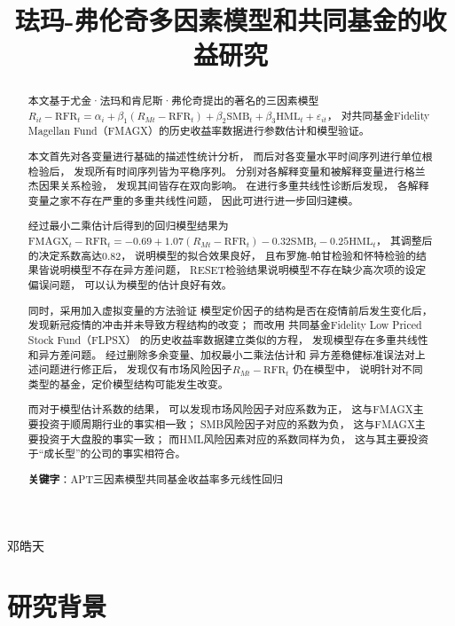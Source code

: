 \documentclass[UTF8]{ctexart}
\title{\textbf{珐玛-弗伦奇多因素模型和共同基金的收益研究} \vspace{-2.5em}}
\date{}
\begin{document}
\maketitle
\centerline{邓皓天}
\renewcommand{\abstractname}{\Large 摘要\\}
\begin{abstract}
  本文基于尤金·法玛和肯尼斯·弗伦奇提出的著名的三因素模型
  $R_{it}-\mathrm{RFR}_t=\alpha _i+\beta _1\left( R_{Mt}-\mathrm{RFR}_t \right) +\beta _2\mathrm{SMB}_t+\beta _3\mathrm{HML}_t+\varepsilon _{it}$，
  对共同基金Fidelity Magellan Fund（FMAGX）的历史收益率数据进行参数估计和模型验证。

  本文首先对各变量进行基础的描述性统计分析，
  而后对各变量水平时间序列进行单位根检验后，
  发现所有时间序列皆为平稳序列。
  分别对各解释变量和被解释变量进行格兰杰因果关系检验，
  发现其间皆存在双向影响。
  在进行多重共线性诊断后发现，
  各解释变量之家不存在严重的多重共线性问题，
  因此可进行进一步回归建模。

  经过最小二乘估计后得到的回归模型结果为
  $\text{FMAGX}_t-\mathrm{RFR}_t=-0.69+1.07\left( R_{Mt}-\mathrm{RFR}_t \right) -0.32\mathrm{SMB}_t-0.25\mathrm{HML}_t$，
  其调整后的决定系数高达0.82，
  说明模型的拟合效果良好，
  且布罗施-帕甘检验和怀特检验的结果皆说明模型不存在异方差问题，
  RESET检验结果说明模型不存在缺少高次项的设定偏误问题，
  可以认为模型的估计良好有效。

  同时，采用加入虚拟变量的方法验证
  模型定价因子的结构是否在疫情前后发生变化后，
  发现新冠疫情的冲击并未导致方程结构的改变；
  而改用
  共同基金Fidelity Low Priced Stock Fund（FLPSX）
  的历史收益率数据建立类似的方程，
  发现模型存在多重共线性和异方差问题。
  经过删除多余变量、加权最小二乘法估计和
  异方差稳健标准误法对上述问题进行修正后，
  发现仅有市场风险因子$R_{Mt}-\mathrm{RFR}_t$
  仍在模型中，
  说明针对不同类型的基金，定价模型结构可能发生改变。

  而对于模型估计系数的结果，
  可以发现市场风险因子对应系数为正，
  这与FMAGX主要投资于顺周期行业的事实相一致；
  SMB风险因子对应的系数为负，
  这与FMAGX主要投资于大盘股的事实一致；
  而HML风险因素对应的系数同样为负，
  这与其主要投资于“成长型”的公司的事实相符合。

  \textbf{关键字}：APT三因素模型\quad 共同基金收益率\quad 多元线性回归
\end{abstract}
\newpage


\section{研究背景}
\end{document}
